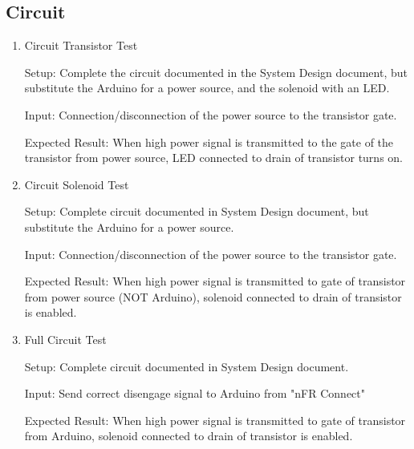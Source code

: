 \documentclass[12pt, titlepage]{article}
\begin{document}
\subsection{Circuit}
\begin{enumerate}
    \item{Circuit Transistor Test} \label{circuitTransistorTest}
    
    Setup: Complete the circuit documented in the System Design document, but substitute the Arduino for a power source, and the solenoid with an LED. 
    
    Input: Connection/disconnection of the power source to the transistor gate.
    
    Expected Result: When high power signal is transmitted to the gate of the transistor from power source, LED connected to drain of transistor turns on.

    \item{Circuit Solenoid Test} \label{circuitSolenoidTest} 

    Setup: Complete circuit documented in System Design document, but substitute the Arduino for a power source. 
    
    Input: Connection/disconnection of the power source to the transistor gate.
    
    Expected Result: When high power signal is transmitted to gate of transistor from power source (NOT Arduino), solenoid connected to drain of transistor is enabled.

    \item{Full Circuit Test} \label{fullCircuitTest}

    Setup: Complete circuit documented in System Design document. 
    
    Input: Send correct disengage signal to Arduino from "nFR Connect"
    
    Expected Result: When high power signal is transmitted to gate of transistor from Arduino, solenoid connected to drain of transistor is enabled.
\end{enumerate}
\end{document}
